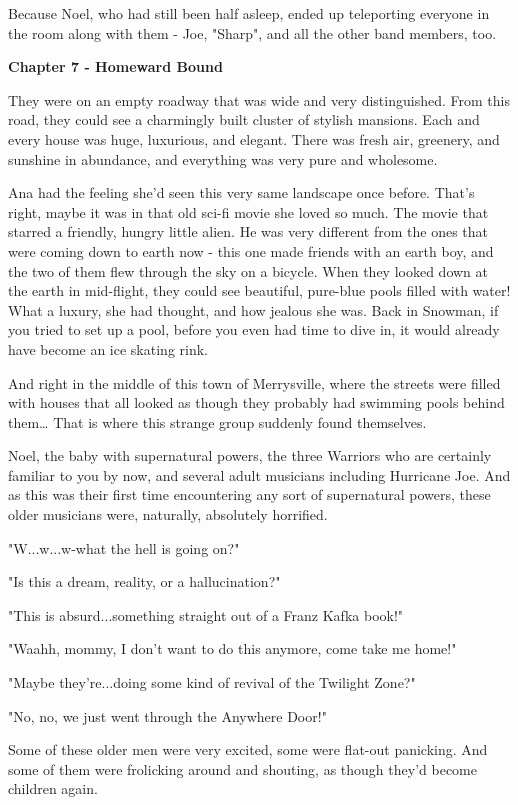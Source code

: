 \documentclass[
]{article}
\begin{document}
Because Noel, who had still been half asleep, ended up teleporting
everyone in the room along with them - Joe, "Sharp", and all the other
band members, too.

\textbf{Chapter 7 - Homeward Bound}

They were on an empty roadway that was wide and very distinguished. From
this road, they could see a charmingly built cluster of stylish
mansions. Each and every house was huge, luxurious, and elegant. There
was fresh air, greenery, and sunshine in abundance, and everything was
very pure and wholesome.

Ana had the feeling she'd seen this very same landscape once before.
That's right, maybe it was in that old sci-fi movie she loved so much.
The movie that starred a friendly, hungry little alien. He was very
different from the ones that were coming down to earth now - this one
made friends with an earth boy, and the two of them flew through the sky
on a bicycle. When they looked down at the earth in mid-flight, they
could see beautiful, pure-blue pools filled with water! What a luxury,
she had thought, and how jealous she was. Back in Snowman, if you tried
to set up a pool, before you even had time to dive in, it would already
have become an ice skating rink.

And right in the middle of this town of Merrysville, where the streets
were filled with houses that all looked as though they probably had
swimming pools behind them\ldots{} That is where this strange group
suddenly found themselves.

Noel, the baby with supernatural powers, the three Warriors who are
certainly familiar to you by now, and several adult musicians including
Hurricane Joe. And as this was their first time encountering any sort of
supernatural powers, these older musicians were, naturally, absolutely
horrified.

"W...w...w-what the hell is going on?"

"Is this a dream, reality, or a hallucination?"

"This is absurd...something straight out of a Franz Kafka book!"

"Waahh, mommy, I don't want to do this anymore, come take me home!"

"Maybe they're...doing some kind of revival of the Twilight Zone?"

"No, no, we just went through the Anywhere Door!"

Some of these older men were very excited, some were flat-out panicking.
And some of them were frolicking around and shouting, as though they'd
become children again.
\end{document}
